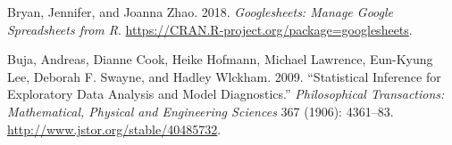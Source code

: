 \documentclass[conference,final,]{IEEEtran}
\begin{document}
\leavevmode\hypertarget{ref-sheets}{}%
Bryan, Jennifer, and Joanna Zhao. 2018. \emph{Googlesheets: Manage
Google Spreadsheets from R}.
\url{https://CRAN.R-project.org/package=googlesheets}.

\leavevmode\hypertarget{ref-SIEDAMD}{}%
Buja, Andreas, Dianne Cook, Heike Hofmann, Michael Lawrence, Eun-Kyung
Lee, Deborah F. Swayne, and Hadley Wlckham. 2009. ``Statistical
Inference for Exploratory Data Analysis and Model Diagnostics.''
\emph{Philosophical Transactions: Mathematical, Physical and Engineering
Sciences} 367 (1906): 4361--83.
\url{http://www.jstor.org/stable/40485732}.
\end{document}
